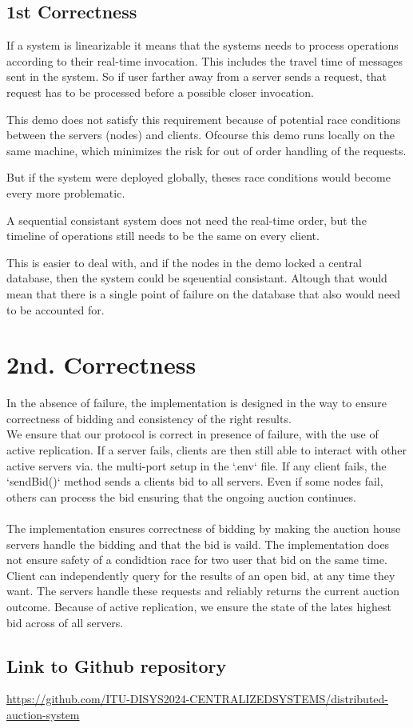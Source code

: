\documentclass[a4paper,11pt]{article}
\begin{document}
\subsection{1st Correctness}
If a system is linearizable it means that the systems needs to process operations according to their real-time invocation.
This includes the travel time of messages sent in the system. So if user farther away from a server sends a request,
that request has to be processed before a possible closer invocation.

This demo does not satisfy this requirement because of potential race conditions between the servers (nodes) and clients.
Ofcourse this demo runs locally on the same machine, which minimizes the risk for out of order handling of the requests.

But if the system were deployed globally, theses race conditions would become every more problematic.


A sequential consistant system does not need the real-time order, but the timeline of operations still needs to be the same on every client.

This is easier to deal with, and if the nodes in the demo locked a central database, then the system could be sqeuential consistant.
Altough that would mean that there is a single point of failure on the database that also would need to be accounted for.

\section{2nd. Correctness}
In the absence of failure, the implementation is designed in the way to ensure correctness of bidding and consistency of the right results.
\\
We ensure that our protocol is correct in presence of failure, with the use of active replication. 
If a server fails, clients are then still able to interact with other active servers via. the multi-port setup in the `.env` file.
If any client fails, the `sendBid()` method sends a clients bid to all servers. Even if some nodes fail, others can process the bid ensuring that the ongoing auction continues.
\\
\\
The implementation ensures correctness of bidding by making the auction house servers handle the bidding and that the bid is vaild. The implementation does not ensure safety of a condidtion race for two user that bid on the same time.
\\
Client can independently query for the results of an open bid, at any time they want. The servers handle these requests and reliably returns the current auction outcome. Because of active replication, we ensure the state of the lates highest bid across of all servers.  
\\

\subsection*{Link to Github repository}

\href{https://github.com/ITU-DISYS2024-CENTRALIZEDSYSTEMS/distributed-auction-system}{https://github.com/ITU-DISYS2024-CENTRALIZEDSYSTEMS/distributed-auction-system}
\end{document}
